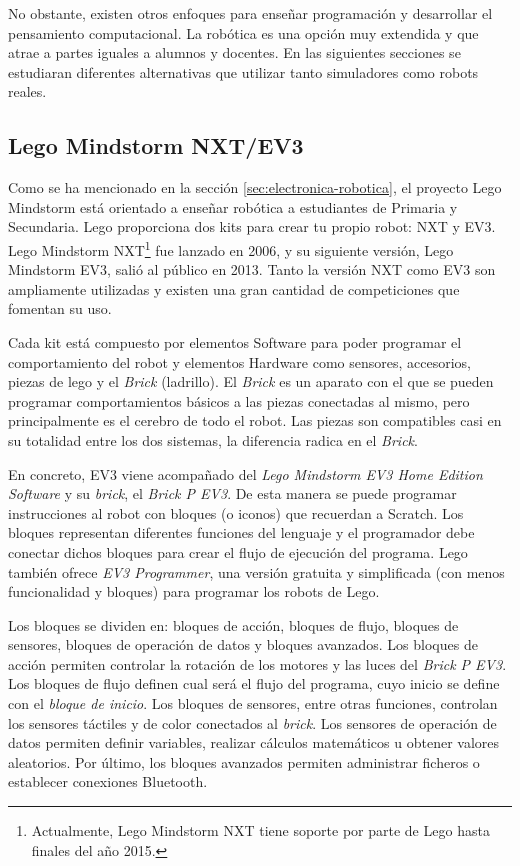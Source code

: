 No obstante, existen otros enfoques para enseñar programación y desarrollar el pensamiento computacional. La robótica es una opción muy extendida y que atrae a partes iguales a alumnos y docentes. En las siguientes secciones se estudiaran diferentes alternativas que utilizar tanto simuladores como robots reales.


\subsection{Lego Mindstorm NXT/EV3}
\label{sec:lego-nxt-ec3}

Como se ha mencionado en la sección \ref{sec:electronica-robotica}, el proyecto Lego Mindstorm\cite{lego-mindstorm} está orientado a enseñar robótica a estudiantes de Primaria y Secundaria. Lego proporciona dos kits para crear tu propio robot: NXT y EV3. Lego Mindstorm NXT\footnote{Actualmente, Lego Mindstorm NXT tiene soporte por parte de Lego hasta finales del año 2015.} fue lanzado en 2006, y su siguiente versión, Lego Mindstorm EV3, salió al público en 2013. Tanto la versión NXT como EV3 son ampliamente utilizadas y existen una gran cantidad de competiciones que fomentan su uso.

Cada kit está compuesto por elementos Software para poder programar el comportamiento del robot y elementos Hardware como sensores, accesorios, piezas de lego y el \emph{Brick} (ladrillo). El \emph{Brick} es un aparato con el que se pueden programar comportamientos básicos a las piezas conectadas al mismo, pero principalmente es el cerebro de todo el robot. Las piezas son compatibles casi en su totalidad entre los dos sistemas, la diferencia radica en el \emph{Brick}. 

En concreto, EV3 viene acompañado del \emph{Lego Mindstorm EV3 Home Edition Software} y su \emph{brick}, el \emph{Brick P EV3}. De esta manera se puede programar instrucciones al robot con bloques (o iconos) que recuerdan a Scratch. Los bloques representan diferentes funciones del lenguaje y el programador debe conectar dichos bloques para crear el flujo de ejecución del programa. Lego también ofrece \emph{EV3 Programmer}, una versión gratuita y simplificada (con menos funcionalidad y bloques) para programar los robots de Lego.

Los bloques se dividen en: bloques de acción, bloques de flujo, bloques de sensores, bloques de operación de datos y bloques avanzados. 
Los bloques de acción permiten controlar la rotación de los motores y las luces del \emph{Brick P EV3}. Los bloques de flujo definen cual será el flujo del programa, cuyo inicio se define con el \emph{bloque de inicio}. Los bloques de sensores, entre otras funciones, controlan los sensores táctiles y de color conectados al \emph{brick}. Los sensores de operación de datos permiten definir variables, realizar cálculos matemáticos u obtener valores aleatorios. Por último, los bloques avanzados permiten administrar ficheros o establecer conexiones Bluetooth.

